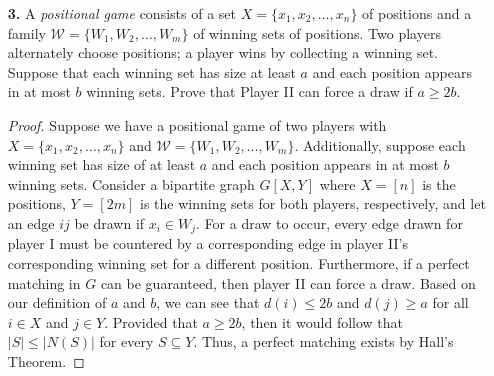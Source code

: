 \documentclass[ 12pt ]{article}
\begin{document}
\begin{enumerate}
			\begin{proof}
				Suppose we have a deck of $mn$ cards as depicted above, dealt in an $n \times m$ array.
				\begin{enumerate}
					\item[\textbf{i.}] Consider a bipartite graph $G[X, Y]$ where $X = [m]$ represents the columns, $Y = [m]$ is the card values, and an edge $uv$ is drawn if the value
						$v$ belongs to a column $u$. Further, consider a subset $S \subseteq X$. It must hold that $|S| \leq |N(S)|$ because to fill $|S|n$ entries in our array, we
						must have at least $|S|$ values since each provides at most $n$ cards. Therefore, by Hall's Theorem, there must exist a perfect matching, and so every column
						has a distinct value.

					\item[\textbf{ii.}] As a result of \textbf{i}, let $M_0$ denote a set of $m$ distinct valued cards, one for each column. First select a suit, then for each card
						in $M_0$, exchange it for the particular card of the same value but with the desired suit. Once this is completed, construct a set $M_1$ with $m$ distinct valued
						cards of the remaining $n-1$ suits. Repeat this process until all suits are exhausted, providing an array of $n \times m$ cards with $n$ distinct suits in each
						column.
				\end{enumerate}
			\end{proof}


		\item[\textbf{3.}] A \textit{positional game} consists of a set $X = \{ x_1, x_2, \hdots, x_n \}$ of positions and a family $\mathcal{W} = \{ W_1, W_2, \hdots, W_m \}$ of
			winning sets of positions. Two players alternately choose positions; a player wins by collecting a winning set. Suppose that each winning set has size at least $a$ and each
			position appears in at most $b$ winning sets. Prove that Player II can force a draw if $a \geq 2b$.

			\begin{proof}
				Suppose we have a positional game of two players with $X = \{ x_1, x_2, \hdots, x_n \}$ and $\mathcal{W} = \{ W_1, W_2, \hdots, W_m \}$. Additionally, suppose each
				winning set has size of at least $a$ and each position appears in at most $b$ winning sets. Consider a bipartite graph $G[X, Y]$ where $X = [n]$ is the positions,
				$Y = [2m]$ is the winning sets for both players, respectively, and let an edge $ij$ be drawn if $x_i \in W_j$. For a draw to occur, every edge drawn for player I
				must be countered by a corresponding edge in player II's corresponding winning set for a different position. Furthermore, if a perfect matching in $G$ can be guaranteed,
				then player II can force a draw. Based on our definition of $a$ and $b$, we can see that $d(i) \leq 2b$ and $d(j) \geq a$ for all $i \in X$ and $j \in Y$. Provided that
				$a \geq 2b$, then it would follow that $|S| \leq |N(S)|$ for every $S \subseteq Y$. Thus, a perfect matching exists by Hall's Theorem.
			\end{proof}



\end{enumerate}
\end{document}
